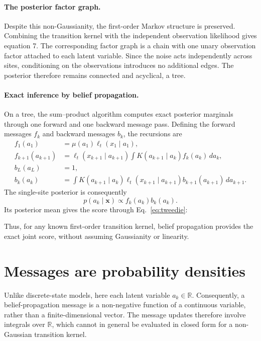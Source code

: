 \documentclass{article}
\begin{document}
\paragraph{The posterior factor graph.}
Despite this non-Gaussianity, the first-order Markov structure
is preserved. Combining the transition kernel with the independent
observation likelihood gives equation 7.
The corresponding factor graph is a chain with one unary
observation factor attached to each latent variable. Since the
noise acts independently across sites, conditioning on the
observations introduces no additional edges. The posterior
therefore remains connected and acyclical, a tree.

\paragraph{Exact inference by belief propagation.}
On a tree, the sum--product algorithm computes exact posterior
marginals through one forward and one backward message pass.
Defining the forward messages $f_k$ and backward messages $b_k$,
the recursions are
\begin{align}
    f_1(a_1)
    &=\mu(a_1)\ell_t(x_1\mid a_1),\\
    f_{k+1}(a_{k+1})
    &=\ell_t(x_{k+1}\mid a_{k+1})
      \int K(a_{k+1}\mid a_k)f_k(a_k)\,da_k,\\
    b_L(a_L)&=1,\\
    b_k(a_k)
    &=\int K(a_{k+1}\mid a_k)
      \ell_t(x_{k+1}\mid a_{k+1})
      b_{k+1}(a_{k+1})\,da_{k+1}.
\end{align}
The single-site posterior is consequently
\begin{equation}
    p(a_k\mid\mathbf x)
    \propto f_k(a_k)b_k(a_k).
\end{equation}
Its posterior mean gives the score through
Eq.~\eqref{eq:tweedie}:

Thus, for any known first-order transition kernel, belief
propagation provides the exact joint score, without assuming
Gaussianity or linearity.
\section{Messages are probability densities}
\label{sec:grid}

Unlike discrete-state models, here each latent variable
$a_k\in\mathbb R$. Consequently, a belief-propagation message
is a non-negative function of a continuous variable, rather
than a finite-dimensional vector. The message updates therefore
involve integrals over $\mathbb R$, which cannot in general be
evaluated in closed form for a non-Gaussian transition kernel.
\end{document}
